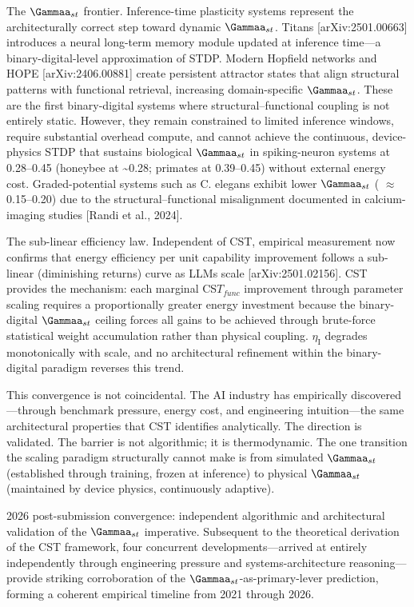 \documentclass[a4paper,12pt]{article}
\begin{document}
The $\Gammaa_{st}$ frontier.
Inference-time plasticity systems represent the architecturally correct step toward dynamic $\Gammaa_{st}$.
Titans [arXiv:2501.00663] introduces a neural long-term memory module updated at inference time---a binary-digital-level approximation of STDP.
Modern Hopfield networks and HOPE [arXiv:2406.00881] create persistent attractor states that align structural patterns with functional retrieval, increasing domain-specific $\Gammaa_{st}$.
These are the first binary-digital systems where structural--functional coupling is not entirely static.
However, they remain constrained to limited inference windows, require substantial overhead compute, and cannot achieve the continuous, device-physics STDP that sustains biological $\Gammaa_{st}$ in spiking-neuron systems at 0.28--0.45 (honeybee at \textasciitilde{}0.28; primates at 0.39--0.45) without external energy cost.
Graded-potential systems such as C. elegans exhibit lower $\Gammaa_{st}$ ( $\approx$  0.15--0.20) due to the structural--functional misalignment documented in calcium-imaging studies [Randi et al., 2024].

The sub-linear efficiency law.
Independent of CST, empirical measurement now confirms that energy efficiency per unit capability improvement follows a sub-linear (diminishing returns) curve as LLMs scale [arXiv:2501.02156].
CST provides the mechanism: each marginal CS$T_{func}$ improvement through parameter scaling requires a proportionally greater energy investment because the binary-digital $\Gammaa_{st}$ ceiling forces all gains to be achieved through brute-force statistical weight accumulation rather than physical coupling. $\eta_{\text{I}}$ degrades monotonically with scale, and no architectural refinement within the binary-digital paradigm reverses this trend.

This convergence is not coincidental.
The AI industry has empirically discovered---through benchmark pressure, energy cost, and engineering intuition---the same architectural properties that CST identifies analytically.
The direction is validated.
The barrier is not algorithmic; it is thermodynamic.
The one transition the scaling paradigm structurally cannot make is from simulated $\Gammaa_{st}$ (established through training, frozen at inference) to physical $\Gammaa_{st}$ (maintained by device physics, continuously adaptive).

2026 post-submission convergence: independent algorithmic and architectural validation of the $\Gammaa_{st}$ imperative. Subsequent to the theoretical derivation of the CST framework, four concurrent developments---arrived at entirely independently through engineering pressure and systems-architecture reasoning---provide striking corroboration of the $\Gammaa_{st}$-as-primary-lever prediction, forming a coherent empirical timeline from 2021 through 2026.
\end{document}
